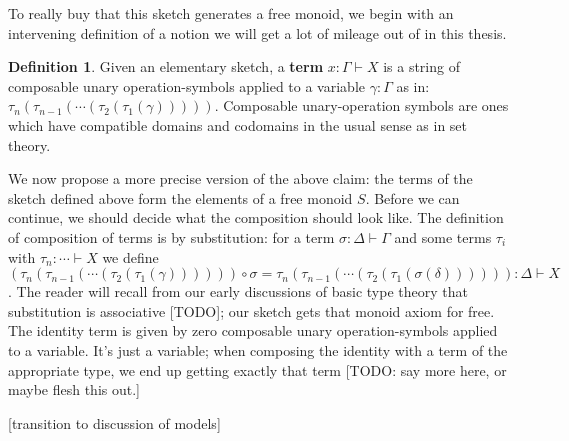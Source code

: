 \documentclass[12pt,twoside]{reedthesis}
\theoremstyle{definition}
\newtheorem{definition}{Definition}
\theoremstyle{remark}
\theoremstyle{theorem}
\begin{document}
To really buy that this sketch generates a free monoid, we begin with an
intervening definition of a notion we will get a lot of mileage out of in this
thesis.
\begin{definition}
  Given an elementary sketch, a \textbf{term} $x : \Gamma \vdash X$ is a string of
  composable unary operation-symbols applied to a variable $\gamma : \Gamma$ as in:
  \( \tau_{n} (\tau_{n-1} (\cdots (\tau_{2}(\tau_{1}(\gamma))))) \). Composable unary-operation
  symbols are ones which have compatible domains and codomains in the usual
  sense as in set theory.
\end{definition}
We now propose a more precise version of the above claim: the terms of the
sketch defined above form the elements of a free monoid \( S \). Before we can
continue, we should decide what the composition should look like. The definition
of composition of terms is by substitution: for a term \( \sigma : \Delta \vdash \Gamma\) and some
terms \( \tau_{i}\) with \( \tau_{n} : \cdots \vdash X \) we define
\[ (\tau_{n} (\tau_{n-1} (\cdots (\tau_{2}(\tau_{1}(\gamma)))))) \circ \sigma = \tau_{n} (\tau_{n-1} (\cdots (\tau_{2}(\tau_{1}(\sigma(\delta)))))) : \Delta \vdash X \].
The reader will recall from our early discussions of basic type theory that
substitution is associative [TODO]; our sketch gets that monoid axiom for free. The
identity term is given by zero composable unary operation-symbols applied to a
variable. It's just a variable; when composing the identity with a term of the
appropriate type, we end up getting exactly that term [TODO: say more here, or maybe
flesh this out.]

  [transition to discussion of models]
\end{document}
